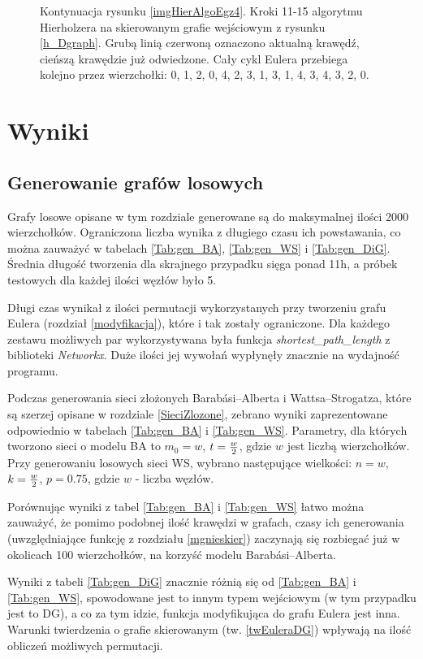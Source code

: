 \documentclass[a4paper, 12pt, twoside, openright]{article}
\begin{document}
\begin{figure}[p]
	\caption[]{Kontynuacja rysunku \ref{imgHierAlgoEgz4}. Kroki 11-15 algorytmu Hierholzera na skierowanym grafie wejściowym z rysunku \ref{h_Dgraph}. Grubą linią czerwoną oznaczono aktualną krawędź, cieńszą krawędzie już odwiedzone. Cały cykl Eulera przebiega kolejno przez wierzchołki: 0, 1, 2, 0, 4, 2, 3, 1, 3, 1, 4, 3, 4, 3, 2, 0.}
	\label{imgHierAlgoEgz5}
	\end{figure}	
\newpage
\newpage
\section{Wyniki}
\subsection{Generowanie grafów losowych}
\indent\par
Grafy losowe opisane w tym rozdziale generowane są do maksymalnej ilości 2000 wierzchołków. Ograniczona liczba wynika z długiego czasu ich powstawania, co można zauważyć w tabelach \ref{Tab:gen_BA}, \ref{Tab:gen_WS} i \ref{Tab:gen_DiG}. Średnia długość tworzenia dla skrajnego przypadku sięga ponad 11h, a próbek testowych dla każdej ilości węzłów było 5. 

Długi czas wynikał z ilości permutacji wykorzystanych przy tworzeniu grafu Eulera (rozdział \ref{modyfikacja}), które i tak zostały ograniczone. Dla każdego zestawu możliwych par wykorzystywana była funkcja \textit{shortest\_path\_length} z biblioteki \textit{Networkx}. Duże ilości jej wywołań wypłynęły znacznie na wydajność programu.

Podczas generowania sieci złożonych Barabási–Alberta i Wattsa–Strogatza, które są szerzej opisane w rozdziale \ref{SieciZlozone}, zebrano wyniki zaprezentowane odpowiednio w tabelach \ref{Tab:gen_BA} i \ref{Tab:gen_WS}. Parametry, dla których tworzono sieci o modelu BA to $m_0 = w$, $t = {w\over2}$, gdzie $w$ jest liczbą wierzchołków. Przy generowaniu losowych sieci WS, wybrano następujące wielkości: $n = w$, $k = {w\over2}$, $p=0.75$, gdzie $w$ - liczba węzłów.



Porównując wyniki z tabel \ref{Tab:gen_BA} i \ref{Tab:gen_WS} łatwo można zauważyć, że pomimo podobnej ilość krawędzi w grafach, czasy ich generowania (uwzględniające funkcję z rozdziału \ref{mgnieskier}) zaczynają się rozbiegać już w okolicach 100 wierzchołków, na korzyść modelu Barabási–Alberta.

Wyniki z tabeli \ref{Tab:gen_DiG} znacznie różnią się od \ref{Tab:gen_BA} i \ref{Tab:gen_WS}, spowodowane jest to innym typem wejściowym (w tym przypadku jest to DG), a co za tym idzie, funkcja modyfikująca do grafu Eulera jest inna. Warunki twierdzenia o grafie skierowanym (tw. \ref{twEuleraDG}) wpływają na ilość obliczeń możliwych permutacji. 
\end{document}
